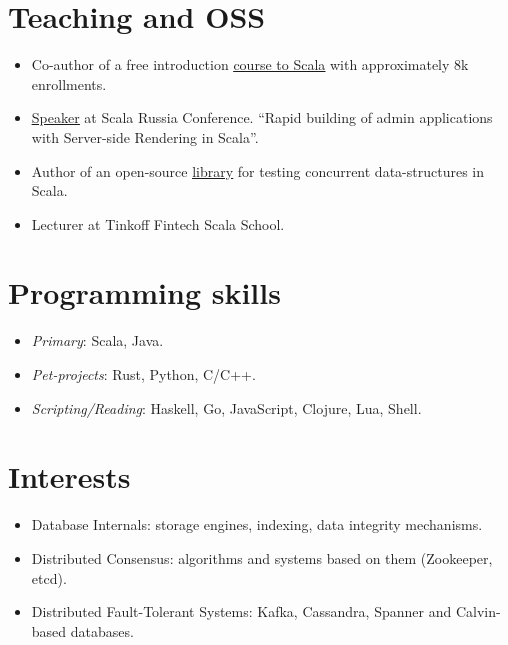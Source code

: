 \documentclass[paper=a4,fontsize=15pt]{scrartcl}
\begin{document}
\section*{Teaching and OSS}{}
\begin{itemize}[noitemsep,leftmargin=20pt,label=\raisebox{0.25ex}{\tiny$\bullet$},topsep=5pt]
  \item Co-author of a free introduction \href{https://stepik.org/course/16243}{\ul{course to Scala}} with approximately 8k enrollments.
  \item \href{https://www.youtube.com/watch?v=8KxWi0xuDKs&t=15s}{\ul{Speaker}} at Scala Russia Conference. ``Rapid building of admin applications with Server-side Rendering in Scala''.
  \item Author of an open-source \href{https://github.com/susliko/lotos}{\ul{library}} for testing concurrent data-structures in Scala.
  \item Lecturer at Tinkoff Fintech Scala School.
\end{itemize}

\section*{Programming skills}{}
\begin{itemize}[noitemsep,leftmargin=20pt,label=\raisebox{0.25ex}{\tiny$\bullet$},topsep=5pt]
    \item \textit{Primary}: Scala, Java.
    \item \textit{Pet-projects}: Rust, Python, C/C++.
    \item \textit{Scripting/Reading}: Haskell, Go, JavaScript, Clojure, Lua, Shell.
\end{itemize}

\section*{Interests}{}
\begin{itemize}[noitemsep,leftmargin=20pt,label=\raisebox{0.25ex}{\tiny$\bullet$},topsep=5pt]
    \item Database Internals: storage engines, indexing, data integrity mechanisms.
    \item Distributed Consensus: algorithms and systems based on them (Zookeeper, etcd).
    \item Distributed Fault-Tolerant Systems: Kafka, Cassandra, Spanner and Calvin-based databases.
\end{itemize}
\end{document}
